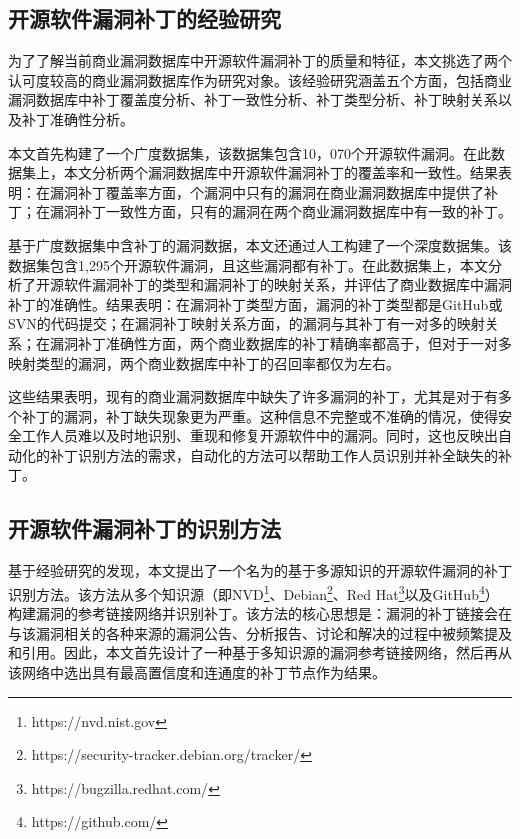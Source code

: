 \subsection{开源软件漏洞补丁的经验研究}
为了了解当前商业漏洞数据库中开源软件漏洞补丁的质量和特征，本文挑选了两个认可度较高的商业漏洞数据库作为研究对象。该经验研究涵盖五个方面，包括商业漏洞数据库中补丁覆盖度分析、补丁一致性分析、补丁类型分析、补丁映射关系以及补丁准确性分析。

本文首先构建了一个广度数据集，该数据集包含10，070个开源软件漏洞。在此数据集上，本文分析两个漏洞数据库中开源软件漏洞补丁的覆盖率和一致性。结果表明：在漏洞补丁覆盖率方面，个漏洞中只有的漏洞在商业漏洞数据库中提供了补丁；在漏洞补丁一致性方面，只有的漏洞在两个商业漏洞数据库中有一致的补丁。%

基于广度数据集中含补丁的漏洞数据，本文还通过人工构建了一个深度数据集。该数据集包含1,295个开源软件漏洞，且这些漏洞都有补丁。在此数据集上，本文分析了开源软件漏洞补丁的类型和漏洞补丁的映射关系，并评估了商业数据库中漏洞补丁的准确性。结果表明：在漏洞补丁类型方面，漏洞的补丁类型都是GitHub或SVN的代码提交；在漏洞补丁映射关系方面，的漏洞与其补丁有一对多的映射关系；在漏洞补丁准确性方面，两个商业数据库的补丁精确率都高于，但对于一对多映射类型的漏洞，两个商业数据库中补丁的召回率都仅为左右。

这些结果表明，现有的商业漏洞数据库中缺失了许多漏洞的补丁，尤其是对于有多个补丁的漏洞，补丁缺失现象更为严重。这种信息不完整或不准确的情况，使得安全工作人员难以及时地识别、重现和修复开源软件中的漏洞。同时，这也反映出自动化的补丁识别方法的需求，自动化的方法可以帮助工作人员识别并补全缺失的补丁。

\subsection{开源软件漏洞补丁的识别方法}
基于经验研究的发现，本文提出了一个名为\tool 的基于多源知识的开源软件漏洞的补丁识别方法。该方法从多个知识源（即NVD\footnote{https://nvd.nist.gov}、Debian\footnote{https://security-tracker.debian.org/tracker/}、Red Hat\footnote{https://bugzilla.redhat.com/}以及GitHub\footnote{https://github.com/}）构建漏洞的参考链接网络并识别补丁。该方法的核心思想是：漏洞的补丁链接会在与该漏洞相关的各种来源的漏洞公告、分析报告、讨论和解决的过程中被频繁提及和引用。因此，本文首先设计了一种基于多知识源的漏洞参考链接网络，然后再从该网络中选出具有最高置信度和连通度的补丁节点作为结果。

